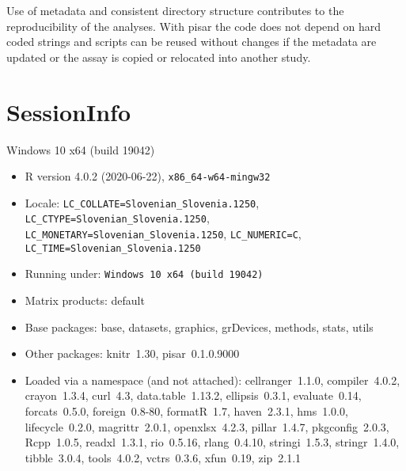 \documentclass[a4paper,12pt]{article}\usepackage[]{graphicx}\usepackage[]{color}
\providecommand{\strong}[1]{{\normalfont\fontseries{b}\selectfont  #1}}
\let\pkg=\strong
\begin{document}
Use of metadata and consistent directory structure contributes to the  reproducibility of the analyses. With \pkg{pisar} the code does not depend on hard coded strings and scripts can be reused without changes if the metadata are updated or the assay is copied or relocated into another study.




%
%

%

\clearpage
\section*{SessionInfo}
Windows 10 x64 (build 19042) 
\begin{itemize}\raggedright
  \item R version 4.0.2 (2020-06-22), \verb|x86_64-w64-mingw32|
  \item Locale: \verb|LC_COLLATE=Slovenian_Slovenia.1250|, \verb|LC_CTYPE=Slovenian_Slovenia.1250|, \verb|LC_MONETARY=Slovenian_Slovenia.1250|, \verb|LC_NUMERIC=C|, \verb|LC_TIME=Slovenian_Slovenia.1250|
  \item Running under: \verb|Windows 10 x64 (build 19042)|
  \item Matrix products: default
  \item Base packages: base, datasets, graphics, grDevices,
    methods, stats, utils
  \item Other packages: knitr~1.30, pisar~0.1.0.9000
  \item Loaded via a namespace (and not attached):
    cellranger~1.1.0, compiler~4.0.2, crayon~1.3.4, curl~4.3,
    data.table~1.13.2, ellipsis~0.3.1, evaluate~0.14,
    forcats~0.5.0, foreign~0.8-80, formatR~1.7, haven~2.3.1,
    hms~1.0.0, lifecycle~0.2.0, magrittr~2.0.1,
    openxlsx~4.2.3, pillar~1.4.7, pkgconfig~2.0.3, Rcpp~1.0.5,
    readxl~1.3.1, rio~0.5.16, rlang~0.4.10, stringi~1.5.3,
    stringr~1.4.0, tibble~3.0.4, tools~4.0.2, vctrs~0.3.6,
    xfun~0.19, zip~2.1.1
\end{itemize}
\end{document}
